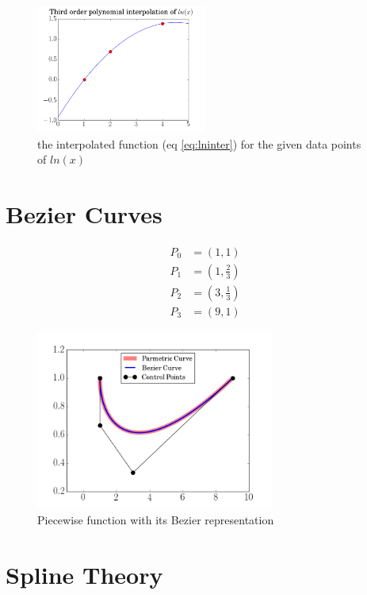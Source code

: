 \documentclass[12pt]{article}
\begin{document}
  \begin{figure}[h!]
    \centering
    \includegraphics[width=0.5\textwidth]{Problem2.png}
    \caption{the interpolated function (eq \ref{eq:lninter}) for the given data points of $ln(x)$} 
  \end{figure}

  \clearpage

  \section{Bezier Curves}

  \begin{align}
    P_0 &= (1,1)            \nonumber \\
    P_1 &= (1,\frac{2}{3})  \nonumber \\
    P_2 &= (3,\frac{1}{3})  \nonumber \\
    P_3 &= (9,1)            \nonumber
  \end{align}

  \begin{figure}[h!]
    \centering
    \includegraphics[width=0.7\textwidth]{Problem3.png}
    \caption{Piecewise function with its Bezier representation}
  \end{figure}

  \clearpage

  \section{Spline Theory}
\end{document}
